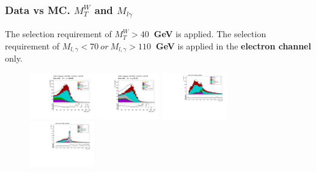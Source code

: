 \begin{frame}\frametitle{Data vs MC. $M_T^W$ and $M_{l\gamma}$}
\scriptsize
The selection requirement of {\bfseries{$M_T^W>40$~GeV}} is applied.
The selection requirement of {\bfseries{$M_{l,\gamma}<70~or~M_{l,\gamma}>110$~GeV}} is applied in the {\bfseries{electron channel}} only.
\begin{figure}[htb]
  \begin{center}
   \includegraphics[width=0.25\textwidth]{../figs/figs_v11/MUON_WGamma/PrepareYields/c_TotalDATAvsMC_EtaCommon__WMtVERY_PRELIMINARY.pdf}\includegraphics[width=0.25\textwidth]{../figs/figs_v11/ELECTRON_WGamma/PrepareYields/c_TotalDATAvsMC_EtaCommon__WMtVERY_PRELIMINARY.pdf}
   \includegraphics[width=0.25\textwidth]{../figs/figs_v11/MUON_WGamma/PrepareYields/c_TotalDATAvsMC_EtaCommon__Mpholep1_pt15to500_.pdf}\includegraphics[width=0.25\textwidth]{../figs/figs_v11/ELECTRON_WGamma/PrepareYields/c_TotalDATAvsMC_EtaCommon__Mpholep1PRELIMINARY_FOR_E_TO_GAMMA_WITH_PSV_CUT_pt15to500_.pdf}
  \end{center}
\end{figure}
\end{frame}

